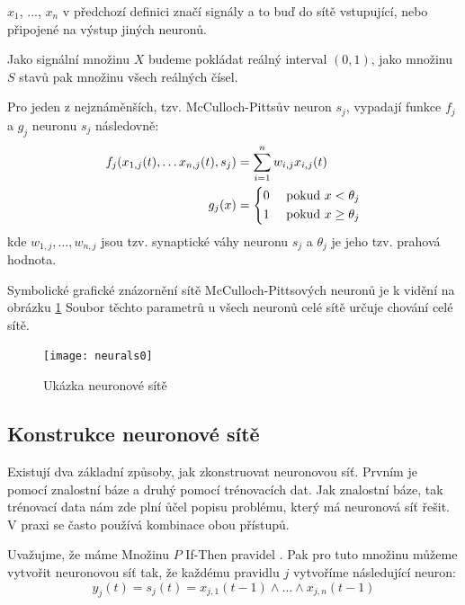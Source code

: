 \documentclass[a4paper,10pt]{article}
\begin{document}
\begin{note}
 $x_1$, ..., $x_n$ v předchozí definici značí signály a to buď do sítě vstupující, nebo připojené na výstup jiných neuronů.
\end{note}

Jako signální množinu $X$ budeme pokládat reálný interval $(0, 1)$, jako množinu $S$ stavů pak množinu všech reálných čísel. 
\begin{example}
 Pro jeden z nejznáměnších, tzv. McCulloch-Pittsův neuron $s_j$, vypadají funkce $f_j$ a $g_j$ neuronu $s_j$ následovně:
 \begin{align*}
  f_j(x_{1,j}(t), \dots x_{n,j}(t), s_j) &=  \sum_{i=1}^n w_{i,j} x_{i,j}(t) \\
  g_j(x) &= 
   \begin{dcases}
    0 & \text{ pokud $x < \theta_j$} \\
    1 & \text{ pokud $x \geq \theta_j$}
   \end{dcases}
 \end{align*}
 kde $w_{1,j}, \dots, w_{n,j}$ jsou tzv. synaptické váhy neuronu $s_j$ a $\theta_j$ je jeho tzv. prahová hodnota. 
 
 Symbolické grafické znázornění sítě McCulloch-Pittsových neuronů je k vidění na obrázku \ref{img:SimplNeuNet} Soubor těchto parametrů u všech neuronů celé sítě určuje chování celé sítě.
\end{example}

\begin{figure}
 \centering
 \texttt{[image: neurals0]}
 \caption{Ukázka neuronové sítě} \label{img:SimplNeuNet}
\end{figure}

\subsection{Konstrukce neuronové sítě}
Existují dva základní způsoby, jak zkonstruovat neuronovou síť. Prvním je pomocí znalostní báze a druhý pomocí trénovacích dat. Jak znalostní báze, tak trénovací data nám zde plní ůčel popisu problému, který má neuronová síť řešit. V praxi se často používá kombinace obou přístupů.


Uvažujme, že máme Množinu $P$ If-Then pravidel . Pak pro tuto množinu můžeme vytvořit neuronovou síť tak, že každému pravidlu $j$ vytvoříme následující neuron:
$$
  y_j(t) = s_j(t) = x_{j,1}(t - 1) \wedge \dots \wedge x_{j,n}(t - 1)
$$
\end{document}
